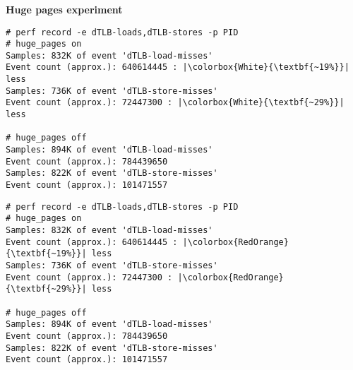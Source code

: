 \documentclass[usenames,dvipsnames, 18pt, compress, aspectratio=169]{beamer}
\begin{document}
\begin{frame}[fragile]{}
    \frametitle{}
    \begin{center}
        \textbf{Huge pages experiment}

    \begin{overprint}
        \begin{flushleft}
        \begin{verbatim}
# perf record -e dTLB-loads,dTLB-stores -p PID
# huge_pages on
Samples: 832K of event 'dTLB-load-misses'
Event count (approx.): 640614445 : |\colorbox{White}{\textbf{~19%}}| less
Samples: 736K of event 'dTLB-store-misses'
Event count (approx.): 72447300 : |\colorbox{White}{\textbf{~29%}}| less

# huge_pages off
Samples: 894K of event 'dTLB-load-misses'
Event count (approx.): 784439650
Samples: 822K of event 'dTLB-store-misses'
Event count (approx.): 101471557
        \end{verbatim}
        \end{flushleft}

        \begin{flushleft}
        \begin{verbatim}
# perf record -e dTLB-loads,dTLB-stores -p PID
# huge_pages on
Samples: 832K of event 'dTLB-load-misses'
Event count (approx.): 640614445 : |\colorbox{RedOrange}{\textbf{~19%}}| less
Samples: 736K of event 'dTLB-store-misses'
Event count (approx.): 72447300 : |\colorbox{RedOrange}{\textbf{~29%}}| less

# huge_pages off
Samples: 894K of event 'dTLB-load-misses'
Event count (approx.): 784439650
Samples: 822K of event 'dTLB-store-misses'
Event count (approx.): 101471557
        \end{verbatim}
        \end{flushleft}

    \end{overprint}
    \end{center}
\end{frame}
\end{document}
